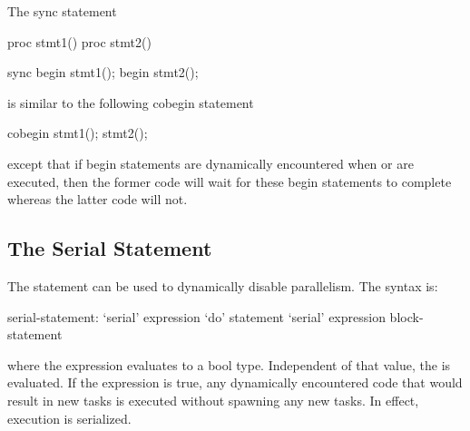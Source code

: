 \begin{example}
The sync statement
\begin{chapelpre}
proc stmt1() { }
proc stmt2() { }
\end{chapelpre}
\begin{chapel}
sync {
  begin stmt1();
  begin stmt2();
}
\end{chapel}
is similar to the following cobegin statement
\begin{chapel}
cobegin {
  stmt1();
  stmt2();
}
\end{chapel}
\begin{chapeloutput}
\end{chapeloutput}
except that if begin statements are dynamically encountered
when  or  are executed, then the former
code will wait for these begin statements to complete whereas the
latter code will not.
\end{example}

\subsection{The Serial Statement}
\label{Serial}

The  statement can be used to dynamically disable
parallelism.  The syntax is:
\begin{syntax}
serial-statement:
  `serial' expression `do' statement
  `serial' expression block-statement
\end{syntax}
where the expression evaluates to a bool type.  Independent of that
value, the  is evaluated. If the expression is true,
any dynamically encountered code that would result in new tasks is
executed without spawning any new tasks.  In effect, execution is
serialized.

